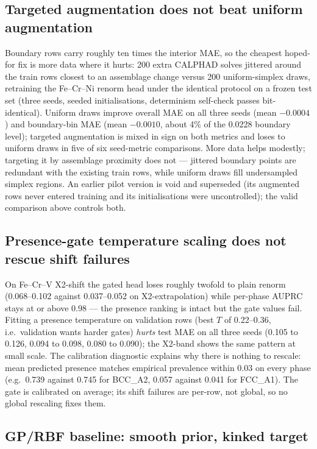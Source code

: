 \documentclass[11pt,a4paper]{article}
\begin{document}
\subsection{Targeted augmentation does not beat uniform augmentation}

Boundary rows carry roughly ten times the interior MAE, so the cheapest
hoped-for fix is more data where it hurts: 200 extra CALPHAD solves
jittered around the train rows closest to an assemblage change versus
200 uniform-simplex draws, retraining the Fe--Cr--Ni renorm head under
the identical protocol on a frozen test set (three seeds, seeded
initialisations, determinism self-check passes bit-identical).
Uniform draws improve overall MAE on all three seeds (mean $-0.0004$)
and boundary-bin MAE (mean $-0.0010$, about 4\% of the 0.0228 boundary
level); targeted augmentation is mixed in sign on both metrics and
loses to uniform draws in five of six seed-metric comparisons. More
data helps modestly;
targeting it by assemblage proximity does not --- jittered boundary
points are redundant with the existing train rows, while uniform draws
fill undersampled simplex regions. An earlier pilot version is void and
superseded (its augmented rows never entered training and its
initialisations were uncontrolled); the valid comparison above controls
both.

\subsection{Presence-gate temperature scaling does not rescue shift failures}

On Fe--Cr--V X2-shift the gated head loses roughly twofold to plain
renorm (0.068--0.102 against 0.037--0.052 on X2-extrapolation) while
per-phase AUPRC stays at or above 0.98 --- the presence ranking is
intact but the gate values fail. Fitting a presence temperature on
validation rows (best $T$ of 0.22--0.36, i.e.\ validation wants harder
gates) \emph{hurts} test MAE on all three seeds (0.105 to 0.126, 0.094
to 0.098, 0.080 to 0.090); the X2-band shows the same pattern at small
scale. The calibration diagnostic explains why there is nothing to
rescale: mean predicted presence matches empirical prevalence within
0.03 on every phase (e.g.\ 0.739 against 0.745 for BCC\_A2, 0.057
against 0.041 for FCC\_A1). The gate is calibrated on average; its
shift failures are per-row, not global, so no global rescaling fixes
them.

\subsection{GP/RBF baseline: smooth prior, kinked target}
\end{document}
